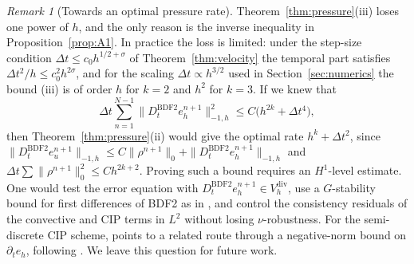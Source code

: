 \documentclass[11pt]{article}
\theoremstyle{remark}\newtheorem{remark}{Remark}
\newcommand{\Vdivh}{V_h^{\mathrm{div}}}
\newcommand{\Dt}{D_t^{\mathrm{BDF2}}}
\theoremstyle{plain}
\newtheorem{corollary}{Corollary}
\newcommand{\new}[1]{{\color{blue}#1}}
\begin{document}
\new{\begin{remark}[Towards an optimal pressure rate]\label{rem:optpressure}
Theorem~\ref{thm:pressure}(iii) loses one power of $h$, and the only reason is the inverse inequality in Proposition~\ref{prop:A1}. In practice the loss is limited: under the step-size condition $\Delta t\le c_0h^{1/2+\sigma}$ of Theorem~\ref{thm:velocity} the temporal part satisfies $\Delta t^2/h\le c_0^2h^{2\sigma}$, and for the scaling $\Delta t\propto h^{3/2}$ used in Section~\ref{sec:numerics} the bound (iii) is of order $h$ for $k=2$ and $h^2$ for $k=3$. If we knew that
\[
\Delta t\sum_{n=1}^{N-1}\|\Dt e_h^{n+1}\|_{-1,h}^2\le C\big(h^{2k}+\Delta t^4\big),
\]
then Theorem~\ref{thm:pressure}(ii) would give the optimal rate $h^k+\Delta t^2$, since $\|\Dt e_u^{n+1}\|_{-1,h}\le C\|\rho^{n+1}\|_0+\|\Dt e_h^{n+1}\|_{-1,h}$ and $\Delta t\sum\|\rho^{n+1}\|_0^2\le Ch^{2k+2}$. Proving such a bound requires an $H^1$-level estimate. One would test the error equation with $\Dt e_h^{n+1}\in\Vdivh$, use a $G$-stability bound for first differences of BDF2 as in \cite{GAJN25}, and control the consistency residuals of the convective and CIP terms in $L^2$ without losing $\nu$-robustness. For the semi-discrete CIP scheme, \cite[Remark~3.9]{GAN25} points to a related route through a negative-norm bound on $\partial_te_h$, following \cite{dFGAJN18}. We leave this question for future work.
\end{remark}}
\end{document}
